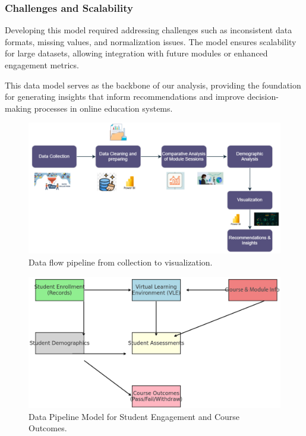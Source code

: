 \subsubsection{Challenges and Scalability}
Developing this model required addressing challenges such as inconsistent data formats, missing values, and normalization issues. The model ensures scalability for large datasets, allowing integration with future modules or enhanced engagement metrics.

This data model serves as the backbone of our analysis, providing the foundation for generating insights that inform recommendations and improve decision-making processes in online education systems.

\begin{figure}[h]
    \centering
    \includegraphics[width=\linewidth]{photo/method.PNG}
    \caption{Data flow pipeline from collection to visualization.}
    \label{fig:method}
\end{figure}

\begin{figure}[h]
    \centering
    \includegraphics[width=\linewidth]{photo/relations.PNG}
    \caption{Data Pipeline Model for Student Engagement and Course Outcomes.}
    \label{fig:relations}
\end{figure}

